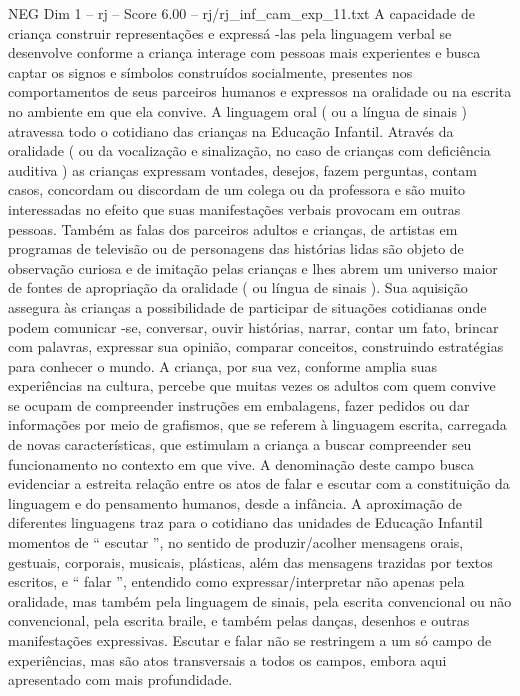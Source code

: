 \begin{textsample}{NEG Dim 1 – rj – Score 6.00 – rj/rj\_inf\_cam\_exp\_11.txt}  \label{ex:f1_neg_014}
A capacidade de criança construir representações e expressá -las pela linguagem verbal se desenvolve conforme a criança interage com pessoas mais experientes e busca captar os signos e símbolos construídos socialmente, presentes nos comportamentos de seus parceiros humanos e expressos na oralidade ou na escrita no ambiente em que ela convive.
A linguagem oral ( ou a língua de sinais ) atravessa todo o cotidiano das crianças na Educação Infantil.
Através da oralidade ( ou da vocalização e sinalização, no caso de crianças com deficiência auditiva ) as crianças expressam vontades, desejos, fazem perguntas, contam casos, concordam ou discordam de um colega ou da professora e são muito interessadas no efeito que suas manifestações verbais provocam em outras pessoas.
Também as falas dos parceiros adultos e crianças, de artistas em programas de televisão ou de personagens das histórias lidas são objeto de observação curiosa e de imitação pelas crianças e lhes abrem um universo maior de fontes de apropriação da oralidade ( ou língua de sinais ).
Sua aquisição assegura às crianças a possibilidade de participar de situações cotidianas onde podem comunicar -se, conversar, ouvir histórias, narrar, contar um fato, brincar com palavras, expressar sua opinião, comparar conceitos, construindo estratégias para conhecer o mundo.
A criança, por sua vez, conforme amplia suas experiências na cultura, percebe que muitas vezes os adultos com quem convive se ocupam de compreender instruções em embalagens, fazer pedidos ou dar informações por meio de grafismos, que se referem à linguagem escrita, carregada de novas características, que estimulam a criança a buscar compreender seu funcionamento no contexto em que vive.
A denominação deste campo busca evidenciar a estreita relação entre os atos de falar e escutar com a constituição da linguagem e do pensamento humanos, desde a infância.
A aproximação de diferentes linguagens traz para o cotidiano das unidades de Educação Infantil momentos de “ escutar ”, no sentido de produzir/acolher mensagens orais, gestuais, corporais, musicais, plásticas, além das mensagens trazidas por textos escritos, e “ falar ”, entendido como expressar/interpretar não apenas pela oralidade, mas também pela linguagem de sinais, pela escrita convencional ou não convencional, pela escrita braile, e também pelas danças, desenhos e outras manifestações expressivas.
Escutar e falar não se restringem a um só campo de experiências, mas são atos transversais a todos os campos, embora aqui apresentado com mais profundidade.

\end{textsample}
